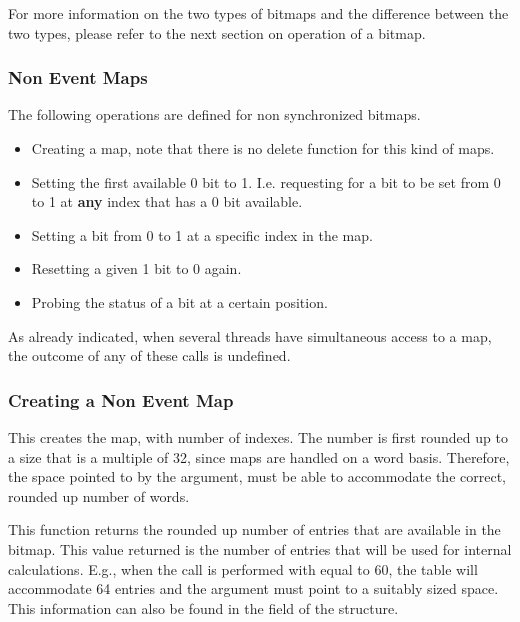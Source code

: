 For more information on the two types of bitmaps and the difference between
the two types, please refer to the next section on operation of a bitmap.

\subsubsection{Non Event Maps}

The following operations are defined for non synchronized bitmaps.

\begin{itemize}
\item Creating a map, note that there is no delete function for this kind of
maps.
\item Setting the first available 0 bit to 1. I.e. requesting for a bit to
be set from 0 to 1 at \textbf{any} index that has a 0 bit available.
\item Setting a bit from 0 to 1 at a specific index in the map.
\item Resetting a given 1 bit to 0 again.
\item Probing the status of a bit at a certain position.
\end{itemize}

As already indicated, when several threads have simultaneous access to a
map, the outcome of any of these calls is undefined.

\subsubsection{Creating a Non Event Map}


This creates the map, with  number of indexes. The
 number is first rounded up to a size that is a multiple of
32, since maps are handled on a word basis. Therefore, the space pointed to
by the  argument, must be able to accommodate the correct,
rounded up number of words.

This function returns the rounded up number of entries that are available in
the bitmap. This value returned is the number of entries that will be used
for internal calculations. E.g., when the call is performed with
 equal to 60, the table will accommodate 64 entries and the
 argument must point to a suitably sized space. This
information can also be found in the 
field of the  structure.

